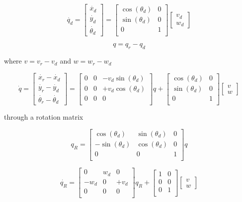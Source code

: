 \documentclass[a4paper,12pt]{article}
\begin{document}
\begin{appendices}
$$ \dot{q_d}=
	\begin{bmatrix} \dot{x_d} \\ \dot{y_d} \\ \dot{\theta_d}  \end{bmatrix}
 	=
  	\begin{bmatrix}
   	\cos (\theta_d) & 0 \\
   	\sin (\theta_d) & 0 \\
    0 & 1 \\
   	\end{bmatrix}
	\begin{bmatrix} v_d \\ w_d \end{bmatrix}
$$

$$ q = q_r-q_d $$

where $v=v_r-v_d$ and $w=w_r-w_d$

$$ \dot{q}=
	\begin{bmatrix} \dot{x_r}-\dot{x_d} \\ \dot{y_r}-\dot{y_d} \\ \dot{\theta_r}-\dot{\theta_d}  \end{bmatrix}
	=  	
  	\begin{bmatrix}
   	0 & 0 & -v_d \sin (\theta_d) \\
   	0 & 0 & +v_d \cos (\theta_d) \\
   	0 & 0 & 0 \\
   	\end{bmatrix}
	q
	+
	\begin{bmatrix}
	\cos (\theta_d) & 0 \\
   	\sin (\theta_d) & 0 \\
    0 & 1 \\
	\end{bmatrix}		
	\begin{bmatrix} v \\ w \end{bmatrix}
$$

through a rotation matrix 

$$ 
	q_R
	=  	
  	\begin{bmatrix}
   	\cos (\theta_d) & \sin (\theta_d) & 0 \\
   	-\sin (\theta_d) & \cos (\theta_d) & 0 \\
   	0 & 0 & 1 \\
   	\end{bmatrix}
   	q
$$

$$ \dot{q_R}
	=  	
  	\begin{bmatrix}
   	0 & w_d & 0 \\
   	-w_d & 0 & +v_d  \\
   	0 & 0 & 0 \\
   	\end{bmatrix}
	q_R
	+
	\begin{bmatrix}
	1 & 0 \\
   	0 & 0 \\
    0 & 1 \\
	\end{bmatrix}		
	\begin{bmatrix} v \\ w \end{bmatrix}
$$


\end{appendices}
\end{document}
